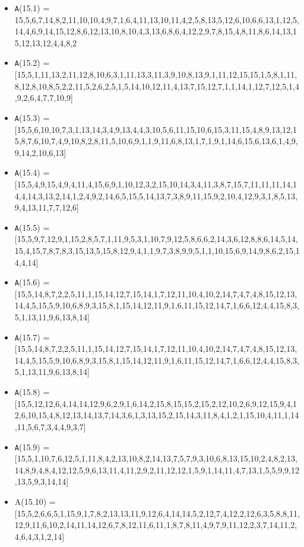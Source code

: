 \documentclass[runningheads,a4paper]{llncs}
\begin{document}
\begin{itemize}
	\item {\texttt A(15.1) = } 15,5,6,7,14,8,2,11,10,10,4,9,7,1,6,4,11,13,10,11,4,2,5,8,13,5,12,6,10,6,6,13,1,12,5,14,4,6,9,14,15,12,8,6,12,13,10,8,10,4,3,13,6,8,6,4,12,2,9,7,8,15,4,8,11,8,6,14,13,15,12,13,12,4,4,8,2
	\item {\texttt A(15.2) = } [15,5,1,11,13,2,11,12,8,10,6,3,1,11,13,3,11,3,9,10,8,13,9,1,11,12,15,15,1,5,8,1,11,8,12,8,10,8,5,2,2,11,5,2,6,2,5,1,5,14,10,12,11,4,13,7,15,12,7,1,1,14,1,12,7,12,5,1,4,9,2,6,4,7,7,10,9]
	\item {\texttt A(15.3) = } [15,5,6,10,10,7,3,1,13,14,3,4,9,13,4,4,3,10,5,6,11,15,10,6,15,3,11,15,4,8,9,13,12,15,8,7,6,10,7,4,9,10,8,2,8,11,5,10,6,9,1,1,9,11,6,8,13,1,7,1,9,1,14,6,15,6,13,6,1,4,9,9,14,2,10,6,13]
	\item {\texttt A(15.4) = } [15,5,4,9,15,4,9,4,11,4,15,6,9,1,10,12,3,2,15,10,14,3,4,11,3,8,7,15,7,11,11,11,14,14,4,14,3,13,2,14,1,2,4,9,2,14,6,5,15,5,14,13,7,3,8,9,11,15,9,2,10,4,12,9,3,1,8,5,13,9,4,13,11,7,7,12,6]
	\item {\texttt A(15.5) = } [15,5,9,7,12,9,1,15,2,8,5,7,1,11,9,5,3,1,10,7,9,12,5,8,6,6,2,14,3,6,12,8,8,6,14,5,14,15,4,15,7,8,7,8,3,15,13,5,15,8,12,9,4,1,1,9,7,3,8,9,9,5,1,1,10,15,6,9,14,9,8,6,2,15,14,4,14]
	\item {\texttt A(15.6) = } [15,5,14,8,7,2,2,5,11,1,15,14,12,7,15,14,1,7,12,11,10,4,10,2,14,7,4,7,4,8,15,12,13,14,4,5,15,5,9,10,6,8,9,3,15,8,1,15,14,12,11,9,1,6,11,15,12,14,7,1,6,6,12,4,4,15,8,3,5,1,13,11,9,6,13,8,14]
	\item {\texttt A(15.7) = } [15,5,14,8,7,2,2,5,11,1,15,14,12,7,15,14,1,7,12,11,10,4,10,2,14,7,4,7,4,8,15,12,13,14,4,5,15,5,9,10,6,8,9,3,15,8,1,15,14,12,11,9,1,6,11,15,12,14,7,1,6,6,12,4,4,15,8,3,5,1,13,11,9,6,13,8,14]
	\item {\texttt A(15.8) = } [15,5,12,12,6,4,14,14,12,9,6,2,9,1,6,14,2,15,8,15,15,2,15,2,12,10,2,6,9,12,15,9,4,12,6,10,15,4,8,12,13,14,13,7,14,3,6,1,3,13,15,2,15,14,3,11,8,4,1,2,1,15,10,4,11,1,14,11,5,6,7,3,4,4,9,3,7]
	\item {\texttt A(15.9) = } [15,5,1,10,7,6,12,5,1,11,8,4,2,13,10,8,2,14,13,7,5,7,9,3,10,6,8,13,15,10,2,4,8,2,13,14,8,9,4,8,4,12,12,5,9,6,13,11,4,11,2,9,2,11,12,12,1,5,9,1,14,11,4,7,13,1,5,5,9,9,12,13,5,9,3,14,14]
	\item  A(15.10) =  [15,5,2,6,6,5,1,15,9,1,7,8,2,13,13,11,9,12,6,4,14,14,5,2,12,7,4,12,2,12,6,3,5,8,8,11,12,9,11,6,10,2,14,11,14,12,6,7,8,12,11,6,11,1,8,7,8,11,4,9,7,9,11,12,2,3,7,14,11,2,4,6,4,3,1,2,14]

\end{itemize}
\end{document}
